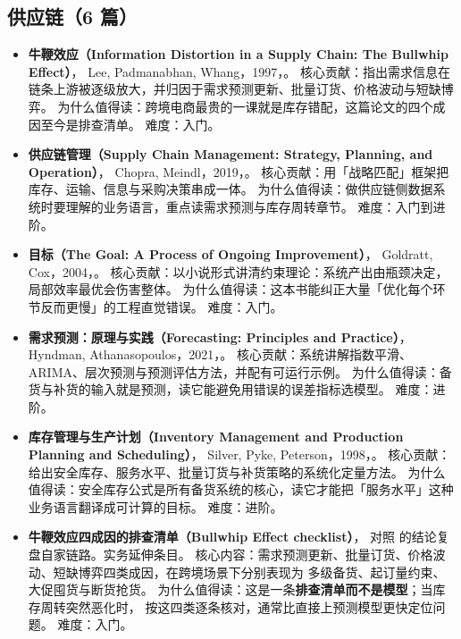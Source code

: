 \subsection{供应链（6 篇）}

\begin{itemize}
  \item \textbf{牛鞭效应（Information Distortion in a Supply Chain: The Bullwhip Effect）}，
        Lee, Padmanabhan, Whang，1997，\cite{lee1997bullwhip}。
        核心贡献：指出需求信息在链条上游被逐级放大，并归因于需求预测更新、批量订货、价格波动与短缺博弈。
        为什么值得读：跨境电商最贵的一课就是库存错配，这篇论文的四个成因至今是排查清单。
        难度：入门。
  \item \textbf{供应链管理（Supply Chain Management: Strategy, Planning, and Operation）}，
        Chopra, Meindl，2019，\cite{chopra2019supply}。
        核心贡献：用「战略匹配」框架把库存、运输、信息与采购决策串成一体。
        为什么值得读：做供应链侧数据系统时要理解的业务语言，重点读需求预测与库存周转章节。
        难度：入门到进阶。
  \item \textbf{目标（The Goal: A Process of Ongoing Improvement）}，
        Goldratt, Cox，2004，\cite{goldratt2004goal}。
        核心贡献：以小说形式讲清约束理论：系统产出由瓶颈决定，局部效率最优会伤害整体。
        为什么值得读：这本书能纠正大量「优化每个环节反而更慢」的工程直觉错误。
        难度：入门。
  \item \textbf{需求预测：原理与实践（Forecasting: Principles and Practice）}，
        Hyndman, Athanasopoulos，2021，\cite{hyndman2021forecasting}。
        核心贡献：系统讲解指数平滑、ARIMA、层次预测与预测评估方法，并配有可运行示例。
        为什么值得读：备货与补货的输入就是预测，读它能避免用错误的误差指标选模型。
        难度：进阶。
  \item \textbf{库存管理与生产计划（Inventory Management and Production Planning and Scheduling）}，
        Silver, Pyke, Peterson，1998，\cite{silver1998inventory}。
        核心贡献：给出安全库存、服务水平、批量订货与补货策略的系统化定量方法。
        为什么值得读：安全库存公式是所有备货系统的核心，读它才能把「服务水平」这种业务语言翻译成可计算的目标。
        难度：进阶。
  \item \textbf{牛鞭效应四成因的排查清单（Bullwhip Effect checklist）}，
        对照 \cite{lee1997bullwhip} 的结论复盘自家链路。实务延伸条目。
        核心内容：需求预测更新、批量订货、价格波动、短缺博弈四类成因，在跨境场景下分别表现为
        多级备货、起订量约束、大促囤货与断货抢货。
        为什么值得读：这是一条\textbf{排查清单而不是模型}；当库存周转突然恶化时，
        按这四类逐条核对，通常比直接上预测模型更快定位问题。
        难度：入门。
\end{itemize}

